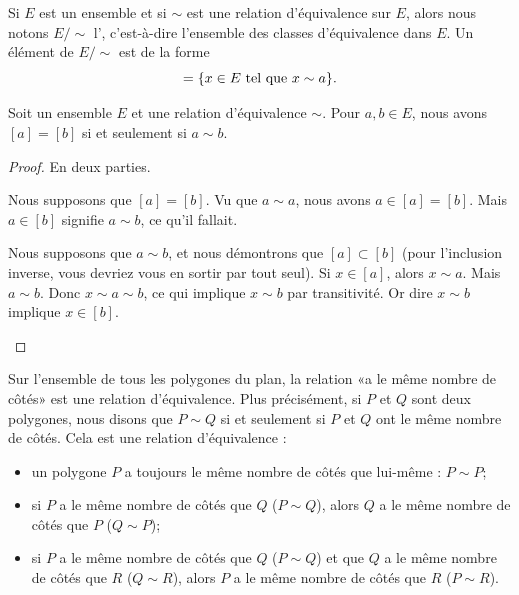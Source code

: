\begin{definition}      \label{DEFooRHPSooHKBZXl}
    Si \( E\) est un ensemble et si \( \sim\) est une relation d'équivalence sur \( E\), alors nous notons \( E/\sim\) l', c'est-à-dire l'ensemble des classes d'équivalence dans \( E\). Un élément de \( E/\sim\) est de la forme
    \begin{equation}
        [a]=\{ x\in E\tq x\sim a \}.
    \end{equation}
\end{definition}

\begin{lemma}
    Soit un ensemble \( E\) et une relation d'équivalence \( \sim\). Pour \( a,b\in E\), nous avons \( [a]=[b]\) si et seulement si \( a\sim b\).
\end{lemma}

\begin{proof}
    En deux parties.
    \begin{subproof}
        \item[\( \Rightarrow\)]
            Nous supposons que \( [a]=[b]\). Vu que \( a\sim a\), nous avons \( a\in [a]=[b]\). Mais \( a\in [b]\) signifie \( a\sim b\), ce qu'il fallait.
        \item[\( \Leftarrow\)]
            Nous supposons que \( a\sim b\), et nous démontrons que \( [a]\subset [b]\) (pour l'inclusion inverse, vous devriez vous en sortir par tout seul). Si \( x\in [a]\), alors \( x\sim a\). Mais \( a\sim b\). Donc \( x\sim a\sim b\), ce qui implique \( x\sim b\) par transitivité. Or dire \( x\sim b\) implique \( x\in [b]\).
    \end{subproof}
\end{proof}

\begin{example}
    Sur l'ensemble de tous les polygones du plan, la relation «a le même nombre de côtés» est une relation d'équivalence. Plus précisément, si $P$ et $Q$ sont deux polygones, nous disons que $P\sim Q$ si et seulement si $P$ et $Q$ ont le même nombre de côtés. Cela est une relation d'équivalence :
    \begin{itemize}
        \item
            un polygone $P$ a toujours le même nombre de côtés que lui-même : $P\sim P$;
        \item
            si $P$ a le même nombre de côtés que $Q$ ($P\sim Q$), alors $Q$ a le même nombre de côtés que $P$ ($Q\sim P$);
        \item
            si $P$ a le même nombre de côtés que $Q$ ($P\sim Q$) et que $Q$ a le même nombre de côtés que $R$ ($Q\sim R$), alors $P$ a le même nombre de côtés que $R$ ($P\sim R$).
    \end{itemize}
\end{example}

